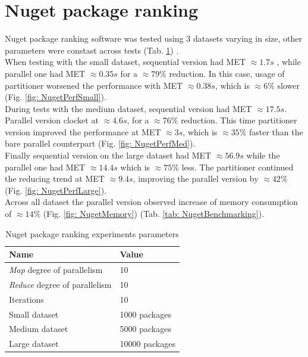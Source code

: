 \section{Nuget package ranking}
Nuget package ranking software was tested using 3 datasets varying in size, 
other parameters were constast across tests (Tab. \ref{tab: NuGetParameters})
. \\
When testing with the small dataset, sequential version had MET $\approx 1.7s$
, while parallel one had MET $\approx 0.35s$ for a $\approx 79\%$ reduction. 
In this case, usage of partitioner worsened the performance with MET  $\approx
 0.38s$, which is $\approx 6\%$ slower (Fig. \ref{fig: NugetPerfSmall}). \\ 
During tests with the medium dataset, sequential version had MET $\approx 17.5
s$. Parallel version clocket at $\approx 4.6s$, for a $\approx 76\%$ 
reduction. This time partitioner version improved the performance at MET $
\approx 3s$, which is $\approx 35\%$ faster than the bare parallel 
counterpart (Fig. \ref{fig: NugetPerfMed}). \\ 
Finally sequential version on the large dataset had MET $\approx 56.9s$ while 
the parallel one had MET $\approx 14.4s$ which is $\approx 75\%$ less.
The partitioner continued the reducing trend at MET $\approx 9.4s$, improving 
the parallel version by $\approx 42 \%$ (Fig. \ref{fig: NugetPerfLarge}). \\
Across all dataset the parallel version observed increase of memory 
consumption of $\approx 14\%$ (Fig. \ref{fig: NugetMemory}) (Tab. \ref{tab: NugetBenchmarking}).

\begin{table}[!ht]
    \centering
    \caption{Nuget package ranking experiments parameters}
		\label{tab: NuGetParameters}
    \begin{tabular}{p{5cm}p{3cm}}
			\toprule
			\bfseries Name 	&
			\bfseries Value \\
			\midrule
			\emph{Map} degree of parallelism & 10 \\
			\emph{Reduce} degree of parallelism & 10 \\
			Iterations & 10 \\ 
			Small dataset  & 1000 packages  \\	
			Medium dataset  & 5000 packages  \\	
			Large dataset  & 10000 packages  \\	
			\bottomrule
    \end{tabular}
\end{table}

